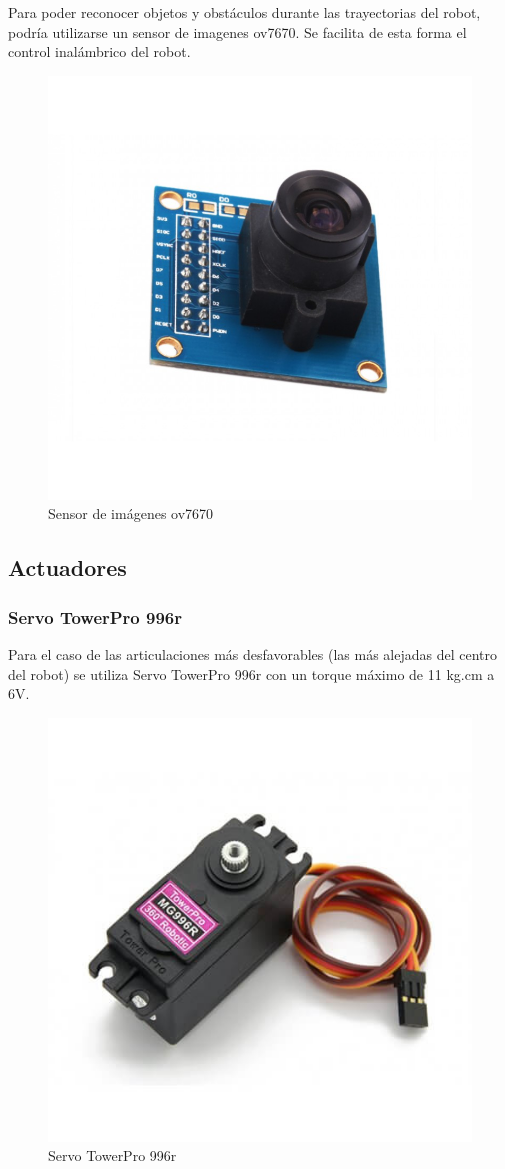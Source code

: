 \documentclass{article}
\begin{document}
Para poder reconocer objetos y obstáculos durante las trayectorias del robot, podría utilizarse un sensor de imagenes ov7670. Se facilita de esta forma el control inalámbrico del robot.

\begin{figure}[!h]
  \centering
  \includegraphics[width=0.5\linewidth]{OV.jpg}
  \caption{Sensor de imágenes ov7670}
\end{figure}

\subsection{Actuadores}

\subsubsection{Servo TowerPro 996r}

Para el caso de las articulaciones más desfavorables (las más alejadas del centro del robot) se utiliza Servo TowerPro 996r con un torque máximo de 11 kg.cm a 6V.

\begin{figure}[!h]
  \centering
  \includegraphics[width=0.5\linewidth]{MG.jpg}
  \caption{Servo TowerPro 996r}
\end{figure}
\end{document}

